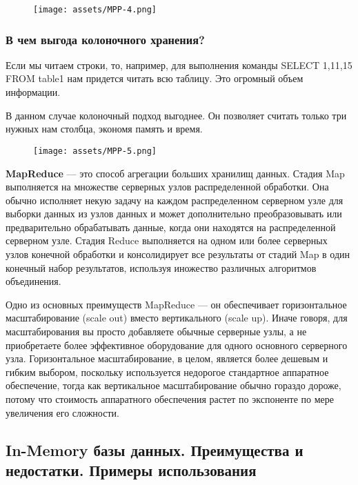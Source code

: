 \begin{figure}[ht!]
	\centering
	\texttt{[image: assets/MPP-4.png]}
	\caption{} 
\end{figure}
\FloatBarrier

\subsubsection{В чем выгода колоночного хранения?}

Если мы читаем строки, то, например, для выполнения команды
SELECT 1,11,15 FROM table1
нам придется читать всю таблицу. Это огромный объем информации.

В данном случае колоночный подход выгоднее. Он позволяет считать
только три нужных нам столбца, экономя память и время.

\begin{figure}[ht!]
	\centering
	\texttt{[image: assets/MPP-5.png]}
	\caption{} 
\end{figure}
\FloatBarrier

\textbf{MapReduce} — это способ агрегации больших хранилищ данных. Стадия
Map выполняется на множестве серверных узлов распределенной
обработки. Она обычно исполняет некую задачу на каждом
распределенном серверном узле для выборки данных из узлов данных и
может дополнительно преобразовывать или предварительно обрабатывать
данные, когда они находятся на распределенной серверном узле. Стадия
Reduce выполняется на одном или более серверных узлов конечной
обработки и консолидирует все результаты от стадий Map в один конечный
набор результатов, используя иножество различных алгоритмов
объединения.

Одно из основных преимуществ MapReduce — он обеспечивает
горизонтальное масштабирование (scale out) вместо вертикального (scale
up). Иначе говоря, для масштабирования вы просто добавляете обычные
серверные узлы, а не приобретаете более эффективное оборудование для
одного основного серверного узла. Горизонтальное масштабирование, в
целом, является более дешевым и гибким выбором, поскольку
используется недорогое стандартное аппаратное обеспечение, тогда как
вертикальное масштабирование обычно гораздо дороже, потому что
стоимость аппаратного обеспечения растет по экспоненте по мере
увеличения его сложности.

\newpage

\subsection{In-Memory базы данных. Преимущества и недостатки. Примеры использования}

